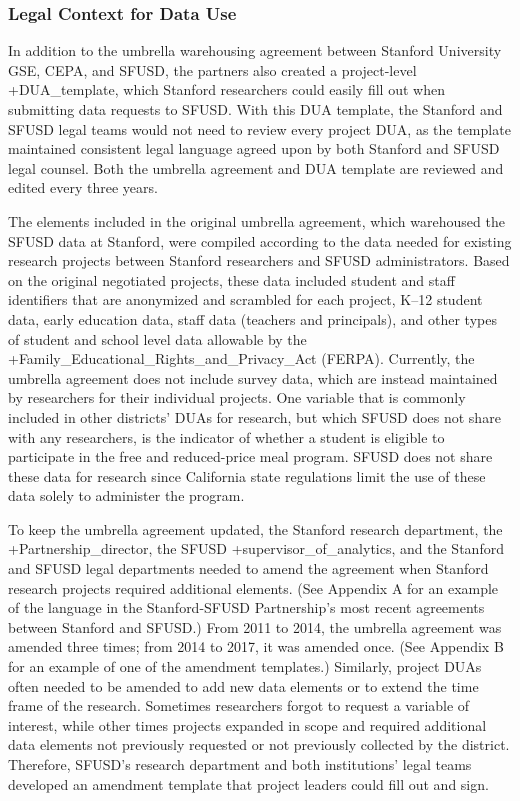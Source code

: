 \documentclass[
]{WileySix}
\begin{document}
\hypertarget{legal-context-for-data-use-5}{%
\subsubsection{Legal Context for Data Use}\label{legal-context-for-data-use-5}}

In addition to the umbrella warehousing agreement between Stanford University GSE, CEPA, and SFUSD, the partners also created a project-level +DUA\_template\textbar, which Stanford researchers could easily fill out when submitting data requests to SFUSD. With this DUA template, the Stanford and SFUSD legal teams would not need to review every project DUA, as the template maintained consistent legal language agreed upon by both Stanford and SFUSD legal counsel. Both the umbrella agreement and DUA template are reviewed and edited every three years.

The elements included in the original umbrella agreement, which warehoused the SFUSD data at Stanford, were compiled according to the data needed for existing research projects between Stanford researchers and SFUSD administrators. Based on the original negotiated projects, these data included student and staff identifiers that are anonymized and scrambled for each project, K--12 student data, early education data, staff data (teachers and principals), and other types of student and school level data allowable by the +Family\_Educational\_Rights\_and\_Privacy\_Act\textbar{} (FERPA). Currently, the umbrella agreement does not include survey data, which are instead maintained by researchers for their individual projects. One variable that is commonly included in other districts' DUAs for research, but which SFUSD does not share with any researchers, is the indicator of whether a student is eligible to participate in the free and reduced-price meal program. SFUSD does not share these data for research since California state regulations limit the use of these data solely to administer the program.

To keep the umbrella agreement updated, the Stanford research department, the +Partnership\_director\textbar, the SFUSD +supervisor\_of\_analytics\textbar, and the Stanford and SFUSD legal departments needed to amend the agreement when Stanford research projects required additional elements. (See Appendix A for an example of the language in the Stanford-SFUSD Partnership's most recent agreements between Stanford and SFUSD.) From 2011 to 2014, the umbrella agreement was amended three times; from 2014 to 2017, it was amended once. (See Appendix B for an example of one of the amendment templates.) Similarly, project DUAs often needed to be amended to add new data elements or to extend the time frame of the research. Sometimes researchers forgot to request a variable of interest, while other times projects expanded in scope and required additional data elements not previously requested or not previously collected by the district. Therefore, SFUSD's research department and both institutions' legal teams developed an amendment template that project leaders could fill out and sign.
\end{document}
